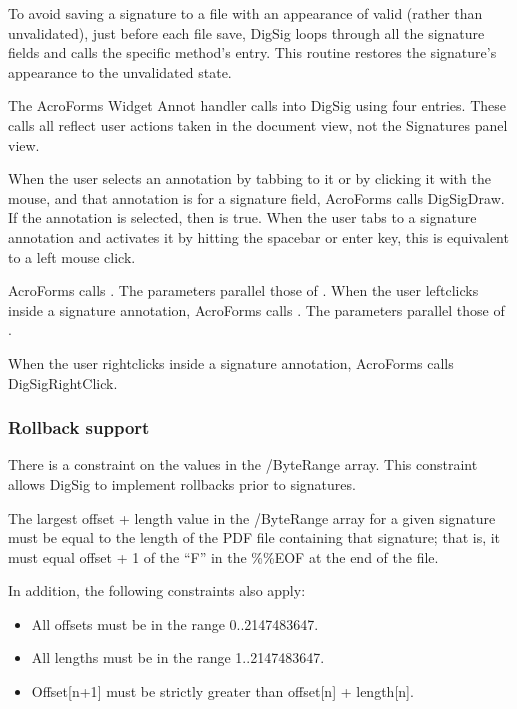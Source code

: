 \documentclass[letterpaper,12pt,english,openany,oneside]{sphinxmanual}
\begin{document}
To avoid saving a signature to a file with an appearance of valid (rather than unvalidated), just before each file save, DigSig loops through all the signature fields and calls the specific method’s  entry. This routine restores the signature’s appearance to the unvalidated state.

The AcroForms Widget Annot handler calls into DigSig using four entries. These calls all reflect user actions taken in the document view, not the Signatures panel view.

When the user selects an annotation by tabbing to it or by clicking it with the mouse, and that annotation is for a signature field, AcroForms calls DigSigDraw. If the annotation is selected, then  is true. When the user tabs to a signature annotation and activates it by hitting the spacebar or enter key, this is equivalent to a left mouse click.

AcroForms calls . The parameters parallel those of . When the user left\sphinxhyphen{}clicks inside a signature annotation, AcroForms calls . The parameters parallel those of .

When the user right\sphinxhyphen{}clicks inside a signature annotation, AcroForms calls DigSigRightClick.


\subsubsection{Rollback support}
\label{\detokenize{Plugins_ExtendedAPI:rollback-support}}
There is a constraint on the values in the /ByteRange array. This constraint allows DigSig to implement rollbacks prior to signatures.

The largest offset + length value in the /ByteRange array for a given signature must be equal to the length of the PDF file containing that signature; that is, it must equal offset + 1 of the “F” in the \%\%EOF at the end of the file.

In addition, the following constraints also apply:
\begin{itemize}
\item {} 
All offsets must be in the range 0..2147483647.

\item {} 
All lengths must be in the range 1..2147483647.

\item {} 
Offset{[}n+1{]} must be strictly greater than offset{[}n{]} + length{[}n{]}.

\end{itemize}
\end{document}
